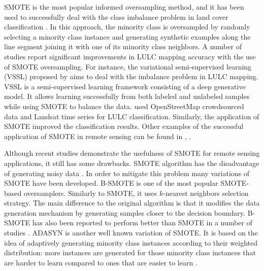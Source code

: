 \documentclass[remotesensing,article,submit,moreauthors,pdftex]{Definitions/mdpi}
\begin{document}
SMOTE is the most popular informed oversampling method, and it has been used to
successfully deal with the class imbalance problem in land cover classification
\cite{Cenggoro2018}. In this approach, the minority class is oversampled by
randomly selecting a minority class instance and generating synthetic examples
along the line segment joining it with one of its minority class neighbors. A
number of studies report significant improvements in LULC mapping accuracy with
the use of SMOTE oversampling. For instance, the variational semi-supervised
learning (VSSL) proposed by \cite{Cenggoro2018} aims to deal with the imbalance
problem in LULC mapping. VSSL is a semi-supervised learning framework consisting
of a deep generative model. It allows learning successfully from both labeled
and unlabeled samples while using SMOTE to balance the data. \cite{Johnson2016}
used OpenStreetMap crowdsourced data and Landsat time series for LULC
classification. Similarly, the application of SMOTE improved the classification
results. Other examples of the successful application of SMOTE in remote sensing
can be found in \cite{Bogner2018}, \cite{Panda2018}.

Although recent studies demonstrate the usefulness of SMOTE for remote sensing
applications, it still has some drawbacks. SMOTE algorithm has the disadvantage
of generating noisy data \cite{Douzas2017}. In order to mitigate this problem
many variations of SMOTE have been developed. B-SMOTE is one of the most popular
SMOTE-based oversamplers. Similarly to SMOTE, it uses $k$-nearest neighbors
selection strategy. The main difference to the original algorithm is that it
modifies the data generation mechanism by generating samples closer to the
decision boundary. B-SMOTE has also been reported to perform better than SMOTE
in a number of studies \cite{Nguyen2009, Ramentol2012}. ADASYN is another well
known variation of SMOTE. It is based on the idea of adaptively generating
minority class instances according to their weighted distribution: more
instances are generated for those minority class instances that are harder to
learn compared to ones that are easier to learn \cite{HaiboHe2008}.
\end{document}
